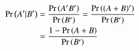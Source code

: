 \begin{align}
\Pr\left(A^\prime|B^\prime\right)&=\frac{\Pr\left(A^\prime B^\prime\right)}{\Pr\left(B^\prime\right)}
	=\frac{\Pr\left((A+B)^\prime\right)}{\Pr\left(B^\prime\right)}
\\
	&=\frac{1-\Pr\left(A+B\right)}{\Pr\left(B^\prime\right)}
\end{align}
